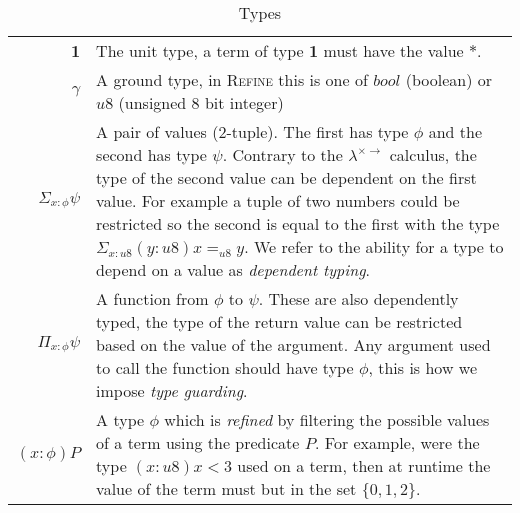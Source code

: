 \begin{table}
    \begin{tabular}{|r|p{}|}
        \hline
        \textbf{1} &
        The unit type, a term of type \textbf{1} must have the value $\ast$.\\\cline{1-2}
        $\gamma$ &
        A ground type, in \textsc{Refine} this is one of $bool$ (boolean) or $u8$ (unsigned 8 bit integer)\\\hline
        $\Sigma_{x:\phi} \psi$ &
        A pair of values (2-tuple).
        The first has type $\phi$ and the second has type $\psi$.
        Contrary to the $\lambda^{\times \rightarrow}$ calculus, the type of the second value
        can be dependent on the first value.
        For example a tuple of two numbers could be restricted so the second is equal to the
        first with the type
        $\Sigma_{x: u8} (y: u8) x =_{u8} y$.
        We refer to the ability for a type to depend on a value as \textit{dependent typing}.\\\cline{1-2}
        $\Pi_{x:\phi} \psi$ &
        A function from $\phi$ to $\psi$.
        These are also dependently typed, the type of the return value can be restricted based on the
        value of the argument.
        Any argument used to call the function should have type $\phi$, this is how we impose
        \textit{type guarding}.\\\cline{1-2}
        $(x:\phi)P$ &
        A type $\phi$ which is \textit{refined} by filtering the possible values of a term using the
        predicate $P$.
        For example, were the type $(x: u8) x < 3$ used on a term, then at runtime the value of the
        term must but in the set $\{0, 1, 2\}$.\\\hline
    \end{tabular}
    \caption{Types}
    \label{tab:types}
\end{table}

